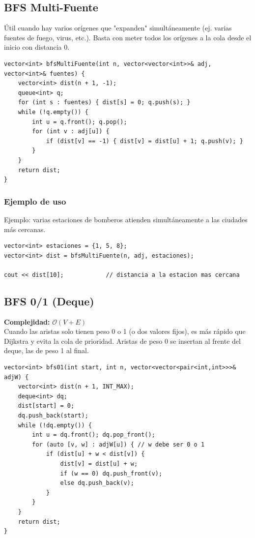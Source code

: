 \documentclass[10pt,twocolumn,letterpaper]{report}
\begin{document}
\subsection{BFS Multi-Fuente}
Útil cuando hay varios orígenes que "expanden" simultáneamente (ej. varias fuentes de fuego, virus, etc.). Basta con meter todos los orígenes a la cola desde el inicio con distancia 0.
\begin{lstlisting}
vector<int> bfsMultiFuente(int n, vector<vector<int>>& adj, vector<int>& fuentes) {
    vector<int> dist(n + 1, -1);
    queue<int> q;
    for (int s : fuentes) { dist[s] = 0; q.push(s); }
    while (!q.empty()) {
        int u = q.front(); q.pop();
        for (int v : adj[u]) {
            if (dist[v] == -1) { dist[v] = dist[u] + 1; q.push(v); }
        }
    }
    return dist;
}
\end{lstlisting}
\subsubsection*{Ejemplo de uso}
Ejemplo: varias estaciones de bomberos atienden simultáneamente a las ciudades más cercanas.
\begin{lstlisting}
vector<int> estaciones = {1, 5, 8};
vector<int> dist = bfsMultiFuente(n, adj, estaciones);

cout << dist[10];            // distancia a la estacion mas cercana
\end{lstlisting}


\subsection{BFS 0/1 (Deque)}
\textbf{Complejidad:} $\mathcal{O}(V + E)$ \\
Cuando las aristas solo tienen peso 0 o 1 (o dos valores fijos), es más rápido que Dijkstra y evita la cola de prioridad. Aristas de peso 0 se insertan al frente del deque, las de peso 1 al final.
\begin{lstlisting}
vector<int> bfs01(int start, int n, vector<vector<pair<int,int>>>& adjW) {
    vector<int> dist(n + 1, INT_MAX);
    deque<int> dq;
    dist[start] = 0;
    dq.push_back(start);
    while (!dq.empty()) {
        int u = dq.front(); dq.pop_front();
        for (auto [v, w] : adjW[u]) { // w debe ser 0 o 1
            if (dist[u] + w < dist[v]) {
                dist[v] = dist[u] + w;
                if (w == 0) dq.push_front(v);
                else dq.push_back(v);
            }
        }
    }
    return dist;
}
\end{lstlisting}
\end{document}
